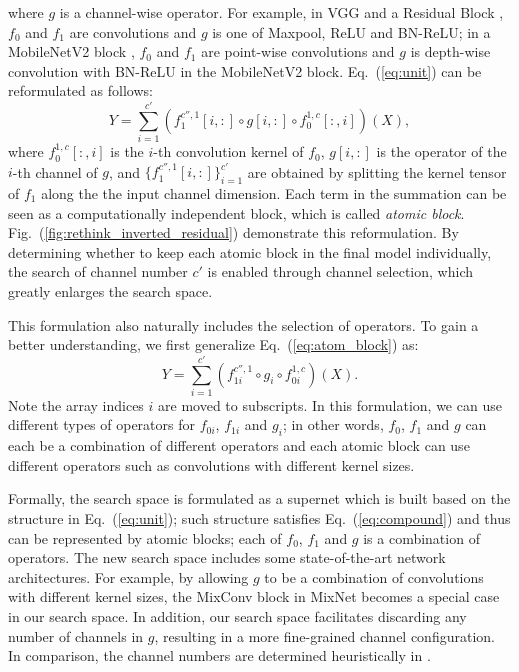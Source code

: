 \documentclass{article} \usepackage{iclr2020_conference,times}
\begin{document}
where $g$ is a channel-wise operator. For example, in VGG \citep{simonyan2015vgg} and a Residual Block \citep{he2016resnet}, $f_0$ and $f_1$ are convolutions and $g$ is one of Maxpool, ReLU and BN-ReLU; in a MobileNetV2 block \citep{sandler2018mobilenetv2}, $f_0$ and $f_1$ are point-wise convolutions and $g$ is depth-wise convolution with BN-ReLU in the MobileNetV2 block.
Eq.~(\ref{eq:unit}) can be reformulated as follows:
\begin{equation}
    Y = \sum_{i=1}^{c'} \left(f_1^{c'',1}[i,:] \circ g[i,:] \circ f_0^{1,c}[:,i]\right)(X), \label{eq:atom_block}
\end{equation}
where $f_0^{1,c}[:,i]$ is the $i$-th convolution kernel of $f_0$, $g[i,:]$ is the operator of the $i$-th channel of $g$, and $\{f_1^{c'',1}[i,:]\}_{i=1}^{c'}$ are obtained by splitting the kernel tensor of $f_1$ along the the input channel dimension. Each term in the summation can be seen as a computationally independent block, which is called {\it atomic block}. Fig.~(\ref{fig:rethink_inverted_residual}) demonstrate this reformulation. By determining whether to keep each atomic block in the final model individually, the search of channel number $c'$ is enabled through channel selection, which greatly enlarges the search space. 

This formulation also naturally includes the selection of operators. To gain a better understanding, we first generalize Eq.~(\ref{eq:atom_block}) as:
\begin{equation}
    Y = \sum_{i=1}^{c'} \left(f_{1i}^{c'',1} \circ g_i \circ f_{0i}^{1,c}\right)(X). \label{eq:compound}
\end{equation}
Note the array indices $i$ are moved to subscripts. In this formulation, we can use different types of operators for $f_{0i}$, $f_{1i}$ and $g_i$; in other words, $f_0$, $f_1$ and $g$ can each be a combination of different operators and each atomic block can use different operators such as convolutions with different kernel sizes.

Formally, the search space is formulated as a supernet which is built based on the structure in Eq.~(\ref{eq:unit}); such structure satisfies Eq.~(\ref{eq:compound}) and thus can be represented by atomic blocks; each of $f_0$, $f_1$ and $g$ is a combination of operators. The new search space includes some state-of-the-art network architectures. For example, by allowing $g$ to be a combination of convolutions with different kernel sizes, the MixConv block in MixNet \citep{tan2019mixnet} becomes a special case in our search space. In addition, our search space facilitates discarding any number of channels in $g$, resulting in a more fine-grained channel configuration. In comparison, the channel numbers are determined heuristically in \cite{tan2019mixnet}.
\end{document}
